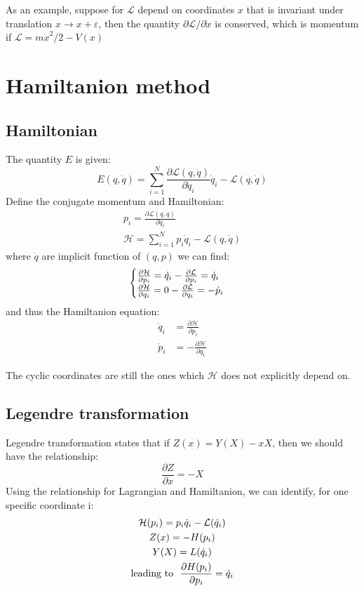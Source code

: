 \documentclass{article}
\newcommand{\pfrac}[2]{\frac{\partial #1}{\partial #2}}
\renewcommand{\L}{\mathcal{L}}
\renewcommand{\H}{\mathcal{H}}
\newcommand{\dotx}{\dot{x}}
\newcommand{\dotq}{\dot{q}}
\newcommand{\dotp}{\dot{p}}
\begin{document}
As an example, suppose for $\L$ depend on coordinates $x$ that is invariant under translation $x \to x + \varepsilon$,
then the quantity $\partial \L / \partial \dotx$ is conserved, which is momentum if $\L = m\dotx^2 / 2 - V(x)$

\section{Hamiltanion method}
\subsection{Hamiltonian}
The quantity $E$ is given:
\begin{equation}
    E(q,\dotq) = \sum_{i=1}^N \pfrac{\L(q,\dotq)}{\dotq_i} \dotq_i - \L(q,\dotq) 
\end{equation}
Define the conjugate momentum and Hamiltonian:
\begin{gather}
    p_i = \pfrac{\L(q,\dotq)}{\dotq_i} \\
    \H = \sum_{i=1}^N p_i \dotq_i - \L(q,\dotq)
\end{gather}
where $\dotq$ are implicit function of $(q,p)$
we can find:
\begin{equation}
    \begin{cases}
        \pfrac{\H}{p_i} = \dotq_i - \pfrac{\L}{p_i} = \dotq_i \notag \\
        \pfrac{\H}{q_i} = 0 - \pfrac{\L}{q_i} = - \dotp_i \notag \\
    \end{cases}
\end{equation}
and thus the Hamiltanion equation:
\begin{align}
        \dotq_i &= \pfrac{\H}{p_i} \\
        \dotp_i &= - \pfrac{\H}{q_i}
\end{align}

The cyclic coordinates are still the ones which $\H$ does not explicitly depend on.

\subsection{Legendre transformation}
Legendre transformation states that if $Z(x) = Y(X) - xX$, then we should have the 
relationship:
\begin{equation}
    \pfrac{Z}{x} = -X
\end{equation}
Using the relationship for Lagrangian and Hamiltanion, we can identify, for one specific coordinate i:
\begin{gather}
    \H(p_i) = p_i \dotq_i - \L(\dotq_i) \notag \\
    Z(x) = -H(p_i) \notag \\
    Y(X) = L(\dotq_i) \notag \\
    \text{leading to}\ \ \pfrac{H(p_i)}{p_i} = \dotq_i
\end{gather}
\end{document}

